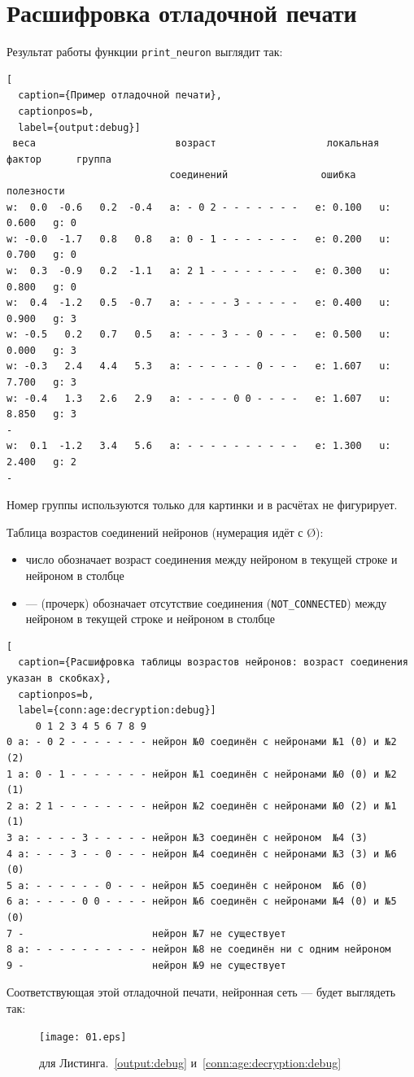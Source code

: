 \documentclass[unicode, 12pt, a4paper,oneside,fleqn]{article}
\begin{document}
\clearpage
\section{Расшифровка отладочной печати}
Результат работы функции \verb'print_neuron' выглядит так:

\begin{lstlisting}[
  caption={Пример отладочной печати},
  captionpos=b,
  label={output:debug}]
 веса                        возраст                   локальная   фактор      группа
                            соединений                ошибка      полезности
w:  0.0  -0.6   0.2  -0.4   a: - 0 2 - - - - - - -   e: 0.100   u: 0.600   g: 0
w: -0.0  -1.7   0.8   0.8   a: 0 - 1 - - - - - - -   e: 0.200   u: 0.700   g: 0
w:  0.3  -0.9   0.2  -1.1   a: 2 1 - - - - - - - -   e: 0.300   u: 0.800   g: 0
w:  0.4  -1.2   0.5  -0.7   a: - - - - 3 - - - - -   e: 0.400   u: 0.900   g: 3
w: -0.5   0.2   0.7   0.5   a: - - - 3 - - 0 - - -   e: 0.500   u: 0.000   g: 3
w: -0.3   2.4   4.4   5.3   a: - - - - - - 0 - - -   e: 1.607   u: 7.700   g: 3
w: -0.4   1.3   2.6   2.9   a: - - - - 0 0 - - - -   e: 1.607   u: 8.850   g: 3
-
w:  0.1  -1.2   3.4   5.6   a: - - - - - - - - - -   e: 1.300   u: 2.400   g: 2
-
\end{lstlisting}

Номер группы используются только для картинки и в расчётах не фигурирует.


Таблица возрастов соединений нейронов (нумерация идёт с \O):
\begin{itemize}
\item число обозначает возраст соединения между нейроном в текущей
  строке и нейроном в столбце
\item --- (прочерк) обозначает отсутствие соединения
  (\verb'NOT_CONNECTED') между нейроном в текущей строке и нейроном в
  столбце
\end{itemize}
\begin{lstlisting}[
  caption={Расшифровка таблицы возрастов нейронов: возраст соединения указан в скобках},
  captionpos=b,
  label={conn:age:decryption:debug}]
     0 1 2 3 4 5 6 7 8 9
0 a: - 0 2 - - - - - - - нейрон №0 соединён с нейронами №1 (0) и №2 (2)
1 a: 0 - 1 - - - - - - - нейрон №1 соединён с нейронами №0 (0) и №2 (1)
2 a: 2 1 - - - - - - - - нейрон №2 соединён с нейронами №0 (2) и №1 (1)
3 a: - - - - 3 - - - - - нейрон №3 соединён с нейроном  №4 (3)
4 a: - - - 3 - - 0 - - - нейрон №4 соединён с нейронами №3 (3) и №6 (0)
5 a: - - - - - - 0 - - - нейрон №5 соединён с нейроном  №6 (0)
6 a: - - - - 0 0 - - - - нейрон №6 соединён с нейронами №4 (0) и №5 (0)
7 -                      нейрон №7 не существует
8 a: - - - - - - - - - - нейрон №8 не соединён ни с одним нейроном
9 -                      нейрон №9 не существует
\end{lstlisting}

Соответствующая этой отладочной печати, нейронная сеть --- будет
выглядеть так:
\begin{figure}[h]
  \center
  \texttt{[image: 01.eps]} %
  \caption{для Листинга.~\ref{output:debug} и~\ref{conn:age:decryption:debug}}
  \label{graph:img}
\end{figure}
\end{document}
